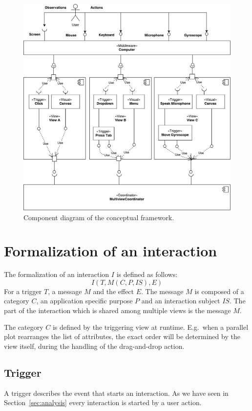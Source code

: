 \begin{figure}[ht]
  \centering
  \includegraphics[width=\textwidth]{figures/concept/Concept}
  \caption{%
    Component diagram of the conceptual framework.
  }\label{fig:concept:component-diagram}
\end{figure}


\section{Formalization of an interaction}

The formalization of an interaction $I$ is defined as follows:
\begin{equation}
  I(T, M(C,P,IS), E)
\end{equation}
For a trigger $T$, a message $M$ and the effect $E$.
The message $M$ is composed of a category $C$, an application specific purpose $P$ and an interaction subject $IS$.
The part of the interaction which is shared among multiple views is the message $M$.

The category $C$ is defined by the triggering view at runtime.
E.g.\ when a parallel plot rearranges the list of attributes, the exact order will be determined by the view itself, during the handling of the drag-and-drop action.


\subsection{Trigger}
A trigger describes the event that starts an interaction.
As we have seen in Section~\ref{sec:analysis} every interaction is started by a user action.

